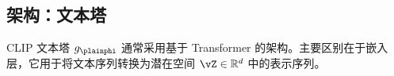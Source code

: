\documentclass[../../book-main_zh.tex]{subfiles}
\begin{document}


\subsection{架构：文本塔}
CLIP 文本塔 \(g_{\plainphi}\) 通常采用基于 Transformer 的架构。主要区别在于嵌入层，它用于将文本序列转换为潜在空间 \(\vZ \in \mathbb{R}^{d}\) 中的表示序列。 
\end{document}
